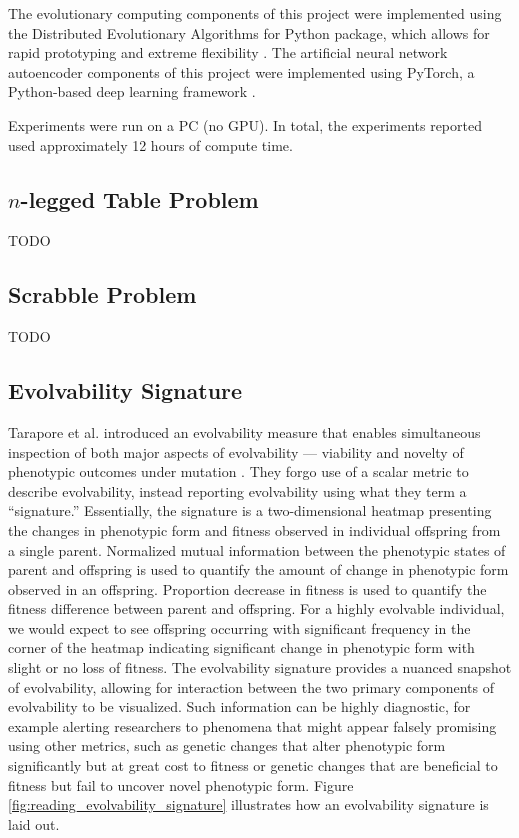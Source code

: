 The evolutionary computing components of this project were implemented using the Distributed Evolutionary Algorithms for Python package, which allows for rapid prototyping and extreme flexibility \cite{fortin2012deap}.
The artificial neural network autoencoder components of this project were implemented using PyTorch, a Python-based deep learning framework \cite{paszke2017pytorch}.

Experiments were run on a PC (no GPU).
In total, the experiments reported used approximately 12 hours of compute time.

\subsection{$n$-legged Table Problem}
TODO

\subsection{Scrabble Problem}
TODO

\subsection{Evolvability Signature}
Tarapore et al. introduced an evolvability measure that enables simultaneous inspection of both major aspects of evolvability --- viability and novelty of phenotypic outcomes under mutation \cite{tarapore2015evolvability}.
They forgo use of a scalar metric to describe evolvability, instead reporting evolvability using what they term a ``signature.''
Essentially, the signature is a two-dimensional heatmap presenting the changes in phenotypic form and fitness observed in individual offspring from a single parent.
Normalized mutual information between the phenotypic states of parent and offspring is used to quantify the amount of change in phenotypic form observed in an offspring.
Proportion decrease in fitness is used to quantify the fitness difference between parent and offspring.
For a highly evolvable individual, we would expect to see offspring occurring with significant frequency in the corner of the heatmap indicating significant change in phenotypic form with slight or no loss of fitness.
The evolvability signature provides a nuanced snapshot of evolvability, allowing for interaction between the two primary components of evolvability to be visualized.
Such information can be highly diagnostic, for example alerting researchers to phenomena that might appear falsely promising using other metrics, such as genetic changes that alter phenotypic form significantly but at great cost to fitness or genetic changes that are beneficial to fitness but fail to uncover novel phenotypic form.
Figure \ref{fig:reading_evolvability_signature} illustrates how an evolvability signature is laid out.


